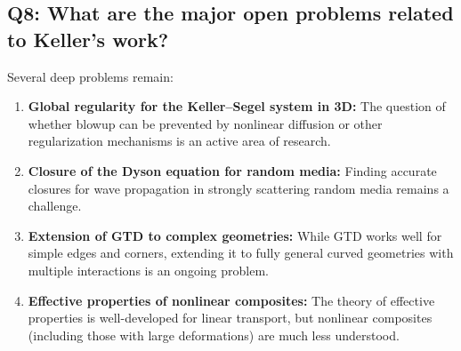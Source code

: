 \subsection*{Q8: What are the major open problems related to Keller's work?}

Several deep problems remain:
\begin{enumerate}
  \item \textbf{Global regularity for the Keller--Segel system in 3D:} The question of whether blowup can be prevented by nonlinear diffusion or other regularization mechanisms is an active area of research.
  \item \textbf{Closure of the Dyson equation for random media:} Finding accurate closures for wave propagation in strongly scattering random media remains a challenge.
  \item \textbf{Extension of GTD to complex geometries:} While GTD works well for simple edges and corners, extending it to fully general curved geometries with multiple interactions is an ongoing problem.
  \item \textbf{Effective properties of nonlinear composites:} The theory of effective properties is well-developed for linear transport, but nonlinear composites (including those with large deformations) are much less understood.
\end{enumerate}

